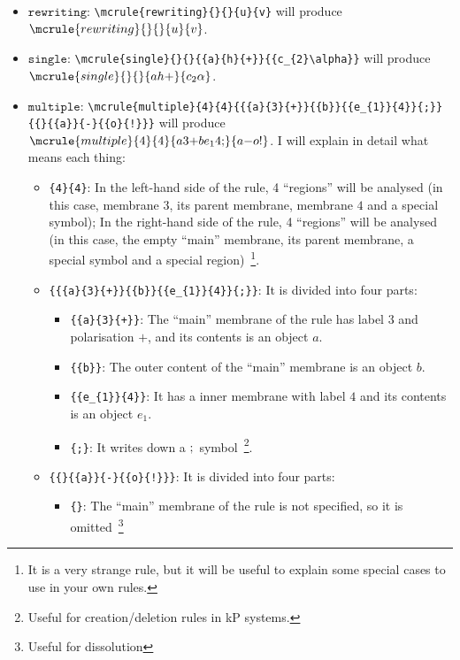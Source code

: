 \documentclass{article}
\begin{document}
\begin{itemize}
\item $\mathtt{rewriting}$: \verb=\mcrule{rewriting}{}{}{u}{v}= will
  produce $\mcrule{rewriting}{}{}{u}{v}$.
\item $\mathtt{single}$:
  \verb=\mcrule{single}{}{}{{a}{h}{+}}{{c_{2}\alpha}}= will produce
  $\mcrule{single}{}{}{{a}{h}{+}}{c_{2}\alpha}$.
\item $\mathtt{multiple}$:\newline
  \verb=\mcrule{multiple}{4}{4}{{{a}{3}{+}}{{b}}{{e_{1}}{4}}{;}}=\newline
  \verb={{}{{a}}{-}{{o}{!}}}= will produce\newline
  $\mcrule{multiple}{4}{4}{{{a}{3}{+}}{{b}}{{e_{1}}{4}}{;}}{{}{{a}}{-}{{o}{!}}}$. I
  will explain in detail what means each thing:
  \begin{itemize}
  \item \verb={4}{4}=: In the left-hand side of the rule, 4
    ``regions'' will be analysed (in this case, membrane $3$, its
    parent membrane, membrane $4$ and a special symbol); In the
    right-hand side of the rule, 4 ``regions'' will be analysed (in
    this case, the empty ``main'' membrane, its parent membrane, a
    special symbol and a special region)~\footnote{It is a very
      strange rule, but it will be useful to explain some special
      cases to use in your own rules.}.
  \item \verb={{{a}{3}{+}}{{b}}{{e_{1}}{4}}{;}}=: It is divided into
    four parts:
    \begin{itemize}
    \item \verb={{a}{3}{+}}=: The ``main'' membrane of the rule has
      label $3$ and polarisation $+$, and its contents is an object
      $a$.
    \item \verb={{b}}=: The outer content of the ``main'' membrane is
      an object $b$.
    \item \verb={{e_{1}}{4}}=: It has a inner membrane with label $4$
      and its contents is an object $e_{1}$.
    \item \verb={;}=: It writes down a $;$ symbol~\footnote{Useful for
        creation/deletion rules in kP systems.}.
    \end{itemize}
  \item \verb={{}{{a}}{-}{{o}{!}}}=: It is divided into four
    parts:
    \begin{itemize}
    \item \verb={}=: The ``main'' membrane of the rule is not
      specified, so it is omitted~\footnote{Useful for dissolution
}
\end{itemize}
\end{itemize}
\end{itemize}
\end{document}

